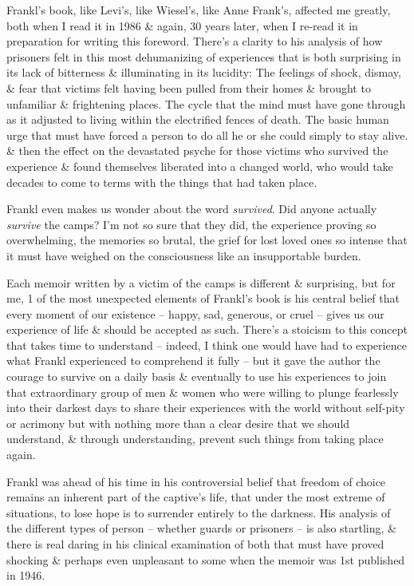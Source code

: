 \documentclass{article}
\numberwithin{equation}{section}
\begin{document}
Frankl's book, like Levi's, like Wiesel's, like Anne Frank's, affected me greatly, both when I read it in 1986 \& again, 30 years later, when I re-read it in preparation for writing this foreword. There's a clarity to his analysis of how prisoners felt in this most dehumanizing of experiences that is both surprising in its lack of bitterness \& illuminating in its lucidity: The feelings of shock, dismay, \& fear that victims felt having been pulled from their homes \& brought to unfamiliar \& frightening places. The cycle that the mind must have gone through as it adjusted to living within the electrified fences of death. The basic human urge that must have forced a person to do all he or she could simply to stay alive. \& then the effect on the devastated psyche for those victims who survived the experience \& found themselves liberated into a changed world, who would take decades to come to terms with the things that had taken place.

Frankl even makes us wonder about the word \textit{survived}. Did anyone actually \textit{survive} the camps? I'm not so sure that they did, the experience proving so overwhelming, the memories so brutal, the grief for lost loved ones so intense that it must have weighed on the consciousness like an insupportable burden.

Each memoir written by a victim of the camps is different \& surprising, but for me, 1 of the most unexpected elements of Frankl's book is his central belief that every moment of our existence -- happy, sad, generous, or cruel -- gives us our experience of life \& should be accepted as such. There's a stoicism to this concept that takes time to understand -- indeed, I think one would have had to experience what Frankl experienced to comprehend it fully -- but it gave the author the courage to survive on a daily basis \& eventually to use his experiences to join that extraordinary group of men \& women who were willing to plunge fearlessly into their darkest days to share their experiences with the world without self-pity or acrimony but with nothing more than a clear desire that we should understand, \& through understanding, prevent such things from taking place again.

Frankl was ahead of his time in his controversial belief that freedom of choice remains an inherent part of the captive's life, that under the most extreme of situations, to lose hope is to surrender entirely to the darkness. His analysis of the different types of person -- whether guards or prisoners -- is also startling, \& there is real daring in his clinical examination of both that must have proved shocking \& perhaps even unpleasant to some when the memoir was 1st published in 1946.
\end{document}
